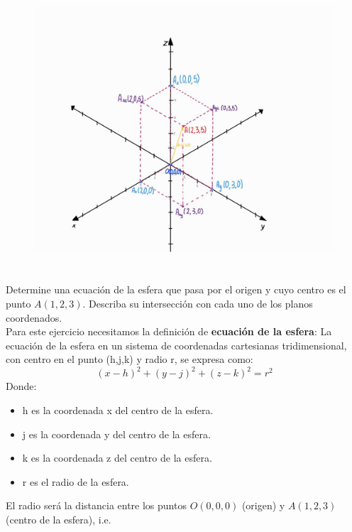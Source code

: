 \documentclass[12pt]{article}
\begin{document}
\begin{itemize}
  \begin{figure}[H]
    \centering
    \includegraphics[width=1\textwidth]{./img/diagonal.jpeg}
  \end{figure}
\end{itemize}

\section{}

Determine una ecuación de la esfera que pasa por el origen y cuyo centro es el punto $A(1,2,3)$. Describa su intersección con cada uno de los planos coordenados.\\
Para este ejercicio necesitamos la definición de \textbf{ecuación de la esfera}: La ecuación de la esfera en un sistema de coordenadas cartesianas tridimensional, con centro en el punto (h,j,k) y radio r, se expresa como:
\[
(x-h)^2+(y-j)^2+(z-k)^2=r^2
\]
Donde:
\begin{itemize}
   \item h es la coordenada x del centro de la esfera.
   \item j es la coordenada y del centro de la esfera.
   \item  k es la coordenada z del centro de la esfera.
   \item  r es el radio de la esfera.
\end{itemize}
El radio será la distancia entre los puntos $O(0,0,0)$ (origen) y $A(1,2,3)$ (centro de la esfera), i.e.
\end{document}

